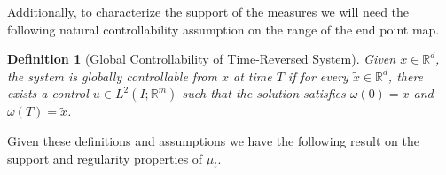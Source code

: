 \documentclass{article}
\newtheorem{theorem}{Theorem}[section]
\newtheorem{definition}[theorem]{Definition}
\newcommand{\Rd}{\mathbb{R}^d}
\begin{document}
Additionally, to characterize the support of the measures we will need the following natural controllability assumption on the range of the end point map.

\begin{definition}[Global Controllability of Time-Reversed System]
\label{def:controllable}
Given $x \in \mathbb{R}^d$, the system is globally controllable from $x$ at time $T$ if for every $\tilde{x} \in \mathbb{R}^d$, there exists a control $u \in L^2(I; \mathbb{R}^m)$ such that the solution satisfies $\omega(0) = x$ and $\omega(T) = \tilde{x}$. 
\end{definition}

Given these definitions and assumptions we have the following result on the support and regularity properties of $\mu_t$.


\end{document}
